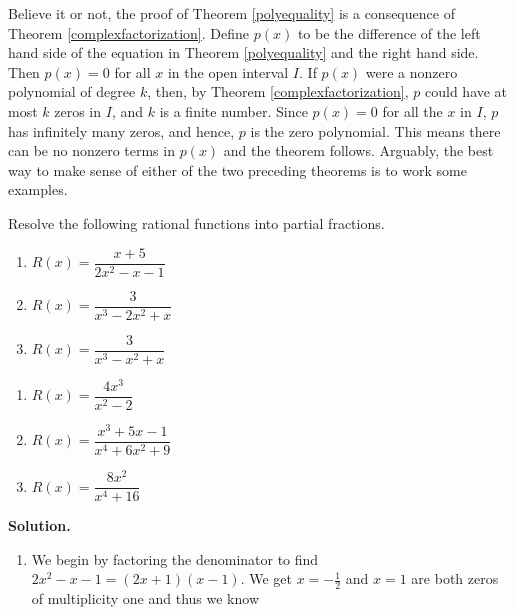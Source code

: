 \smallskip

Believe it or not, the proof of Theorem \ref{polyequality} is a consequence of Theorem \ref{complexfactorization}.  Define $p(x)$ to be the difference of the left hand side of the equation in Theorem \ref{polyequality} and the right hand side.  Then $p(x) = 0$ for all $x$ in the open interval $I$.  If $p(x)$ were a nonzero polynomial of degree $k$, then, by Theorem \ref{complexfactorization}, $p$ could have at most $k$ zeros in $I$, and $k$ is a finite number.  Since $p(x) = 0$ for all the $x$ in $I$, $p$ has infinitely many zeros, and hence, $p$ is the zero polynomial.  This means there can be no nonzero terms in $p(x)$ and the theorem follows.  Arguably, the best way to make sense of either of the two preceding theorems is to work some examples.  

\begin{ex}  Resolve the following rational functions into partial fractions.

\begin{multicols}{3}
\begin{enumerate}

\item  $R(x) = \dfrac{x+5}{2x^2-x-1}$

\item  $R(x) = \dfrac{3}{x^3-2x^2+x}$

\item  $R(x) = \dfrac{3}{x^3-x^2+x}$

\setcounter{HW}{\value{enumi}}
\end{enumerate}
\end{multicols}


\begin{multicols}{3}
\begin{enumerate}
\setcounter{enumi}{\value{HW}}

\item  $R(x) = \dfrac{4x^3}{x^2-2}$

\item  $R(x) = \dfrac{x^3+5x-1}{x^4+6x^2+9}$

\item  $R(x) = \dfrac{8x^2}{x^4+16}$

\end{enumerate}
\end{multicols}
{\bf Solution.}  

\begin{enumerate}

\item  We begin by factoring the denominator to find $2x^2-x-1 = (2x+1)(x-1)$.  We get $x=-\frac{1}{2}$ and $x=1$ are both zeros of multiplicity one and thus we know


\end{enumerate}
\end{ex}
